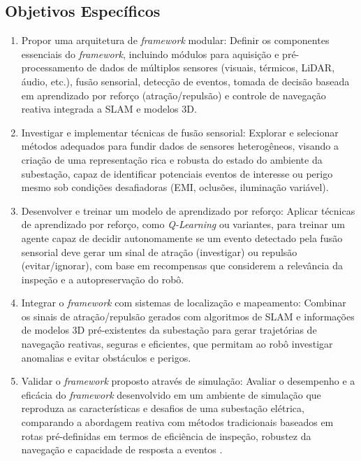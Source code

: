 \subsection{Objetivos Específicos}
\begin{enumerate}
    \item Propor uma arquitetura de \textit{framework} modular: Definir os componentes essenciais do \textit{framework}, incluindo módulos para aquisição e pré-processamento de dados de múltiplos sensores (visuais, térmicos, \ac{LiDAR}, áudio, etc.), fusão sensorial, detecção de eventos, tomada de decisão baseada em aprendizado por reforço (atração/repulsão) e controle de navegação reativa integrada a \ac{SLAM} e modelos 3D.
    
    \item Investigar e implementar técnicas de fusão sensorial: Explorar e selecionar métodos adequados para fundir dados de sensores heterogêneos, visando a criação de uma representação rica e robusta do estado do ambiente da subestação, capaz de identificar potenciais eventos de interesse ou perigo mesmo sob condições desafiadoras (\ac{EMI}, oclusões, iluminação variável).
    
    \item Desenvolver e treinar um modelo de aprendizado por reforço: Aplicar técnicas de aprendizado por reforço, como \textit{Q-Learning} ou variantes, para treinar um agente capaz de decidir autonomamente se um evento detectado pela fusão sensorial deve gerar um sinal de atração (investigar) ou repulsão (evitar/ignorar), com base em recompensas que considerem a relevância da inspeção e a autopreservação do robô.
    
    \item Integrar o \textit{framework} com sistemas de localização e mapeamento: Combinar os sinais de atração/repulsão gerados com algoritmos de \ac{SLAM} e informações de modelos 3D pré-existentes da subestação para gerar trajetórias de navegação reativas, seguras e eficientes, que permitam ao robô investigar anomalias e evitar obstáculos e perigos.
    
    \item Validar o \textit{framework} proposto através de simulação: Avaliar o desempenho e a eficácia do \textit{framework} desenvolvido em um ambiente de simulação que reproduza as características e desafios de uma subestação elétrica, comparando a abordagem reativa com métodos tradicionais baseados em rotas pré-definidas em termos de eficiência de inspeção, robustez da navegação e capacidade de resposta a eventos \cite{collins2021simulation}.
    
\end{enumerate}
